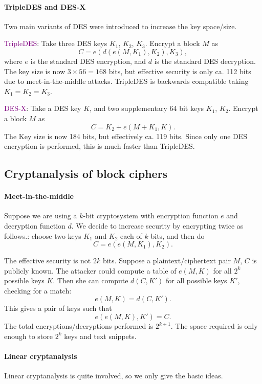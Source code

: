 \documentclass[a4paper, 11pt, openany]{book}
\numberwithin{equation}{section}
\theoremstyle{plain}
\theoremstyle{definition}
\newcommand{\Define}[1]{\textcolor{purple}{#1}}
\begin{document}
\paragraph{TripleDES and DES-X}
Two main variants of DES were introduced to increase the key space/size.

\Define{TripleDES}: Take three DES keys $K_1$, $K_2$, $K_3$. Encrypt a block $M$ as 
\[
    C = e( d( e(M, K_1), K_2), K_3), 
\]
where $e$ is the standard DES encryption, and $d$ is the standard DES decryption. The key size is now $3 \times 56 = 168$ bits, but effective security is only ca. 112 bits due to meet-in-the-middle attacks. TripleDES is backwards compatible taking $K_1 = K_2 = K_3$.

\Define{DES-X}: Take a DES key $K$, and two supplementary 64 bit keys $K_1$, $K_2$. Encrypt a block $M$ as 
\[
    C = K_2 + e( M + K_1, K ).
\]
The  Key size is now 184 bits, but effectively ca. 119 bits. Since only one DES encryption is performed, this is much faster than TripleDES.



\subsection{Cryptanalysis of block ciphers}

\paragraph{Meet-in-the-middle}
Suppose we are using a $k$-bit cryptosystem with encryption function $e$ and decryption function $d$. We decide to increase security by encrypting twice as follows.: choose two keys $K_1$ and $K_2$ each of $k$ bits, and then do
\[
    C = e( e(M,K_1) , K_2).
\]

The effective security is not $2k$ bits. Suppose a plaintext/ciphertext pair $M$, $C$ is publicly known. The attacker could compute a table of $e(M,K)$ for all $2^k$ possible keys $K$. Then she can compute $d(C,K')$ for all possible keys $K'$, checking for a match:
\[
    e(M,K) = d(C,K'). 
\]
This gives a pair of keys such that 
\[ 
    e( e(M,K) , K') = C.
\]
The total encryptions/decryptions performed is $2^{k+1}$. The space required is only enough to store $2^k$ keys and text snippets.


\paragraph{Linear cryptanalysis}
Linear cryptanalysis is quite involved, so we only give the basic ideas.
\end{document}

